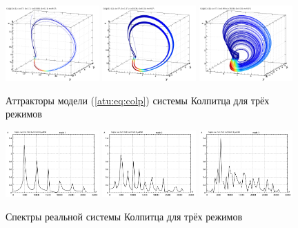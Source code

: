 \begin{figure}[htb!]
 \centerline{
   \includegraphics[width=0.32\textwidth]{p/mod/colp_0-p_xyz_b=1x70.png}
   \includegraphics[width=0.32\textwidth]{p/mod/colp_0-p_xyz_b=1x37.png}
   \includegraphics[width=0.32\textwidth]{p/mod/colp_0-p_xyz_b=0x99.png}
 }
  \caption{Аттракторы модели (\ref{atu:eq:colp}) системы Колпитца для трёх режимов}
  \label{atu:f:colp_model_xyz}
\end{figure}

\begin{figure}[htb!]
 \centerline{
   \includegraphics[width=0.32\textwidth]{p/mod/colp_m1_f.png}
   \includegraphics[width=0.32\textwidth]{p/mod/colp_m2_f.png}
   \includegraphics[width=0.32\textwidth]{p/mod/colp_m3_f.png}
 }
  \caption{Спектры реальной системы Колпитца  для трёх режимов}
  \label{atu:f:colp_real_f}
\end{figure}

